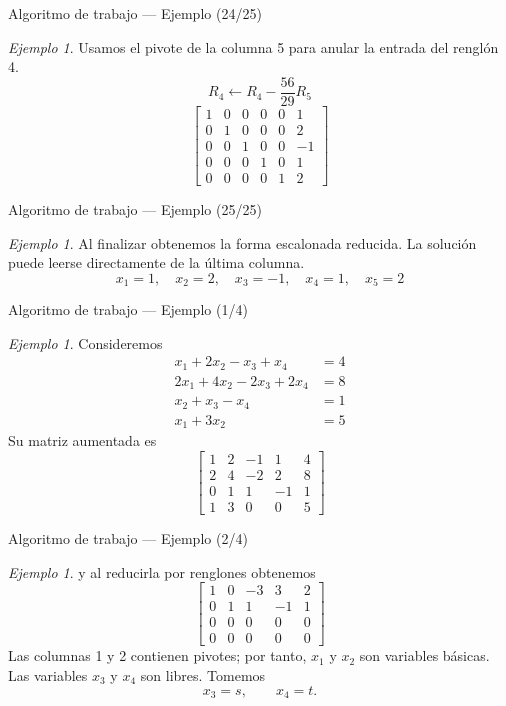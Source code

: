 \documentclass[aspectratio=169,11pt]{beamer}
\theoremstyle{remark}
\newtheorem{Ejem}[definicion]{Ejemplo}
\begin{document}
\begin{frame}{Algoritmo de trabajo — Ejemplo (24/25)}
\begin{Ejem}
Usamos el pivote de la columna 5 para anular la entrada del renglón 4.
\[
R_{4}\leftarrow R_{4}-\frac{56}{29}R_{5}
\]
\[
\left[\begin{array}{ccccc|c}
1 & 0 & 0 & 0 & 0 & 1\\
0 & 1 & 0 & 0 & 0 & 2\\
0 & 0 & 1 & 0 & 0 & -1\\
0 & 0 & 0 & 1 & 0 & 1\\
0 & 0 & 0 & 0 & 1 & 2
\end{array}\right]
\]
\end{Ejem}
\end{frame}

\begin{frame}{Algoritmo de trabajo — Ejemplo (25/25)}
\begin{Ejem}
Al finalizar obtenemos la forma escalonada reducida. La solución puede leerse directamente de la última columna.
\[
\boxed{x_{1}=1,\quad x_{2}=2,\quad x_{3}=-1,\quad x_{4}=1,\quad x_{5}=2}
\]
\end{Ejem}
\end{frame}

\begin{frame}{Algoritmo de trabajo — Ejemplo (1/4)}
\begin{Ejem}
Consideremos
\[
\begin{aligned}
x_{1} + 2 x_{2} - x_{3} + x_{4} &= 4\\
2 x_{1} + 4 x_{2} - 2 x_{3} + 2 x_{4} &= 8\\
x_{2} + x_{3} - x_{4} &= 1\\
x_{1} + 3 x_{2} &= 5
\end{aligned}
\]
Su matriz aumentada es
\[
\left[\begin{array}{cccc|c}
1 & 2 & -1 & 1 & 4\\
2 & 4 & -2 & 2 & 8\\
0 & 1 & 1 & -1 & 1\\
1 & 3 & 0 & 0 & 5
\end{array}\right]
\]
\end{Ejem}
\end{frame}

\begin{frame}{Algoritmo de trabajo — Ejemplo (2/4)}
\begin{Ejem}
y al reducirla por renglones obtenemos
\[
\left[\begin{array}{cccc|c}
1 & 0 & -3 & 3 & 2\\
0 & 1 & 1 & -1 & 1\\
0 & 0 & 0 & 0 & 0\\
0 & 0 & 0 & 0 & 0
\end{array}\right]
\]
Las columnas 1 y 2 contienen pivotes; por tanto, \(x_1\) y \(x_2\) son variables básicas. Las variables
\(x_3\) y \(x_4\) son libres. Tomemos
\[
x_3=s,\qquad x_4=t.
\]
\end{Ejem}
\end{frame}
\end{document}
